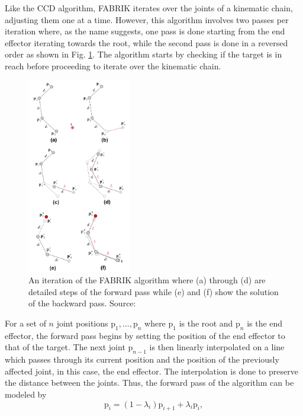 Like the CCD algorithm, FABRIK iterates over the joints of a kinematic chain,
adjusting them one at a time. However, this algorithm involves two passes per
iteration where, as the name suggests, one pass is done starting from the end
effector iterating towards the root, while the second pass is done in a reversed
order as shown in Fig. \ref{fig:fabrik}. The algorithm starts by checking if the
target is in reach before proceeding to iterate over the kinematic chain. 

\begin{figure}[!h]
    \centering
    \captionsetup{justification=centering}
    \includegraphics[width=0.4\textwidth]{grafika/fabrik_iteration.png}
    \caption{An iteration of the FABRIK algorithm where (a) through (d) are
    detailed steps of the forward pass while (e) and (f) show the solution of
    the backward pass. Source: \cite{Aristidou2011}}
    \label{fig:fabrik}
\end{figure}

For a set of \(n\) joint positions \(\mbox{p}_1, \dots, \mbox{p}_n\) where
\(\mbox{p}_1\) is the root and \(\mbox{p}_n\) is the end effector, the forward pass
begins by setting the position of the end effector to that of the target. The
next joint \(\mbox{p}_{n-1}\) is then linearly interpolated on a line which
passes through its current position and the position of the previously affected
joint, in this case, the end effector. The interpolation is done to preserve the
distance between the joints. Thus, the forward pass of the algorithm can be
modeled by 
\begin{equation}
    \mbox{p}_i = (1 - \lambda_i)\mbox{p}_{i+1} + \lambda_i \mbox{p}_i,
\end{equation}

